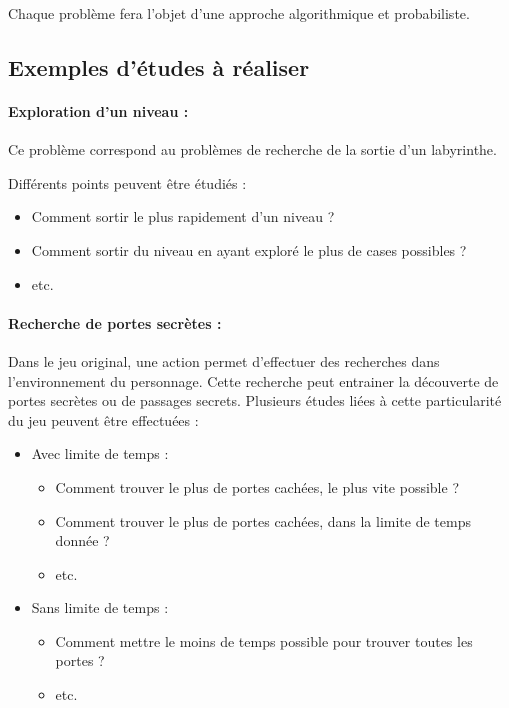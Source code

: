 \documentclass[12pt]{article}
\begin{document}
Chaque problème fera l'objet d'une approche algorithmique et probabiliste.

\subsection{Exemples d'études à réaliser}

\paragraph{Exploration d'un niveau :}

Ce problème correspond au problèmes de recherche de la sortie d'un labyrinthe.

Différents points peuvent être étudiés : 
\begin{itemize}
	\item Comment sortir le plus rapidement d'un niveau ? 
	\item Comment sortir du niveau en ayant exploré le plus de cases possibles ? 
	\item etc.
\end{itemize}


\paragraph{Recherche de portes secrètes :}

Dans le jeu original, une action permet d'effectuer des recherches dans l'environnement du personnage. Cette recherche peut entrainer la découverte de portes secrètes ou de passages secrets. Plusieurs études liées à cette particularité du jeu peuvent être effectuées : 
\begin{itemize}
	\item Avec limite de temps : 
	\begin{itemize}
		\item Comment trouver le plus de portes cachées, le plus vite possible ? 
		\item Comment trouver le plus de portes cachées, dans la limite de temps donnée ? 
		\item etc. 
	\end{itemize}
	\item Sans limite de temps : 
	\begin{itemize}
		\item Comment mettre le moins de temps possible pour trouver toutes les portes ? 
		\item etc.
	\end{itemize}
\end{itemize}
\end{document}
